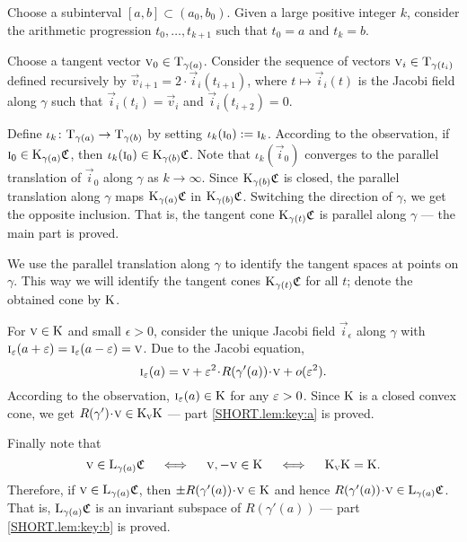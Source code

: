\documentclass[a4paper,10pt]{article}
\begin{document}
Choose a subinterval $[a,b] \subset (a_0,b_0)$.
Given a large positive integer $k$, consider  {\color{red}  the } arithmetic progression
$t_0,\dots,t_{k+1}$ such that $t_0=a$ and $t_k=b$.

Choose a tangent vector $\text{\sc{v}}_0\in\mathrm{T}_{\gamma(a)}$.
Consider the sequence of vectors $\vec{v}_i\z\in\T_{\gamma(t_i)}$ defined recursively by $\vec{v}_{i+1}=2\cdot \vec{i}_i(t_{i+1})$, where $t\mapsto \vec{i}_i(t)$ is the Jacobi field along $\gamma$ such that $\vec{i}_i(t_i)=\vec{v}_i$ and $\vec{i}_i(t_{i+2})=0$.

Define $\iota_k\colon\mathrm{T}_{\gamma(a)}\to \mathrm{T}_{\gamma(b)}$ by setting $\iota_k(\text{\sc{i}}_0)\mathrel{{:}{=}} \text{\sc{i}}_k$.
According to the observation, if $\text{\sc{i}}_0\in \mathrm{K}_{\gamma(a)}\mathfrak{C}$, then $\iota_k(\text{\sc{i}}_0)\in \mathrm{K}_{\gamma(b)}\mathfrak{C}$.
Note that $\iota_k(\vec{i}_0)$ converges to the parallel translation of $\vec{i}_0$ along $\gamma$ as $k\to \infty$.
Since $\mathrm{K}_{\gamma(b)}\mathfrak{C}$ is closed,
the parallel translation along $\gamma$ maps $\mathrm{K}_{\gamma(a)}\mathfrak{C}$ in $\mathrm{K}_{\gamma(b)}\mathfrak{C}$.
Switching the direction of $\gamma$, we get the opposite inclusion.
That is, the tangent cone $\mathrm{K}_{\gamma(t)}\mathfrak{C}$ is parallel along $\gamma$ --- the main part is proved.

We use the parallel translation along $\gamma$ to identify the tangent spaces at points on $\gamma$.
This way we will identify the tangent cones $\mathrm{K}_{\gamma(t)}\mathfrak{C}$ for all $t$;
denote the obtained cone by $\mathrm{K}$.

For $\text{\sc{v}}\in \mathrm{K}$ and small $\epsilon>0$, consider the unique Jacobi field $\vec{i}_\epsilon$ along $\gamma$ with $\vec{i}_\epsilon (a+\eps)\z=\vec{i} _\epsilon(a-\eps)=\vec{v}$.
Due to the Jacobi equation,
\[\vec{i}_\epsilon (a)=\vec{v} +\eps^2\cdot R(\gamma'(a))\cdot \vec{v} +o(\eps^2).\]
According to the observation, $\text{\sc{i}}_\varepsilon(a)\in \mathrm{K}$ for any $\varepsilon>0$.
Since $\mathrm{K}$ is a closed convex cone, we get $R(\gamma')\cdot \vec{v}\z\in \K_\vec{v}\K$ --- part \ref{SHORT.lem:key:a} is proved.

Finally note that 
\[\text{\sc{v}}\in \mathrm{L}_{\gamma(a)}\mathfrak{C}
\quad\iff\quad 
\text{\sc{v}}, -\text{\sc{v}}\in \mathrm{K}
\quad\iff\quad 
\mathrm{K}_{\text{\sc{v}}}\mathrm{K}=\mathrm{K}.
\]
Therefore, if $\text{\sc{v}}\in \mathrm{L}_{\gamma(a)}\mathfrak{C}$, then $\pm R(\gamma'(a))\cdot \vec{v}\in \K$ and hence $R(\gamma'(a))\cdot \vec{v}\in \L_{\gamma(a)}\mathfrak{C}$.
That is, $\mathrm{L}_{\gamma(a)}\mathfrak{C}$ is an invariant subspace of $R(\gamma'(a))$ --- part \ref{SHORT.lem:key:b} is proved.
\qeds
\end{document}
